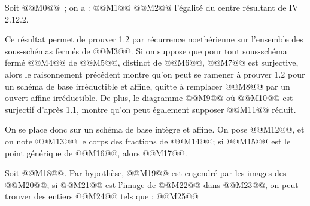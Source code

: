 
Soit @@M0@@~; on a :
@@M1@@
@@M2@@
l'égalité du centre résultant de IV 2.12.2.

Ce résultat permet de prouver 1.2 par récurrence noethérienne sur l'ensemble des sous-schémas fermés de @@M3@@. Si on suppose que pour tout sous-schéma fermé @@M4@@ de @@M5@@, distinct de @@M6@@, @@M7@@ est surjective, alors le raisonnement précédent montre qu'on peut se ramener à prouver 1.2 pour un schéma de base irréductible et affine, quitte à remplacer @@M8@@ par un ouvert affine irréductible. De plus, le diagramme
@@M9@@
où @@M10@@ est surjectif d'après 1.1, montre qu'on peut également supposer @@M11@@ réduit.

On se place donc sur un schéma de base intègre et affine. On pose @@M12@@, et on note @@M13@@ le corps des fractions de @@M14@@; si @@M15@@ est le point générique de @@M16@@, alors @@M17@@.

Soit @@M18@@. Par hypothèse, @@M19@@ est engendré par les images des @@M20@@; si @@M21@@ est l'image de @@M22@@ dans @@M23@@, on peut trouver des entiers @@M24@@ tels que :
@@M25@@
